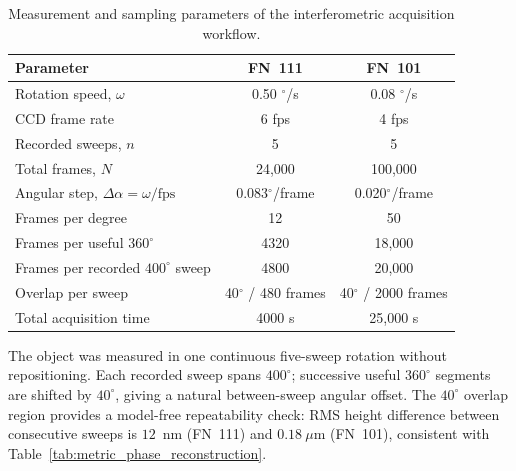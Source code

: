\documentclass[review]{elsarticle}
\begin{document}
\begin{table}[ht]
\centering
\caption{Measurement and sampling parameters of the interferometric acquisition workflow.}
\label{tab:meas_param}
\begin{tabular}{lcc}
\toprule
Parameter & FN~111 & FN~101 \\
\midrule
Rotation speed, $\omega$ & 0.50 $^\circ$/s & 0.08 $^\circ$/s \\
CCD frame rate & 6 fps & 4 fps \\
Recorded sweeps, $n$ & 5 & 5 \\
Total frames, $N$ & 24,000 & 100,000 \\
Angular step, $\Delta\alpha=\omega/\mathrm{fps}$ & 0.083$^\circ$/frame & 0.020$^\circ$/frame \\
Frames per degree & 12 & 50 \\
Frames per useful $360^\circ$ & 4320 & 18,000 \\
Frames per recorded $400^\circ$ sweep & 4800 & 20,000 \\
Overlap per sweep & 40$^\circ$ / 480 frames & 40$^\circ$ / 2000 frames \\
Total acquisition time & 4000 s & 25,000 s \\
\bottomrule
\end{tabular}
\end{table}

The object was measured in one continuous five-sweep rotation without repositioning. Each recorded sweep spans $400^\circ$; successive useful $360^\circ$ segments are shifted by $40^\circ$, giving a natural between-sweep angular offset. The $40^\circ$ overlap region provides a model-free repeatability check: RMS height difference between consecutive sweeps is $12$~nm (FN~111) and $0.18~\mu$m (FN~101), consistent with Table~\ref{tab:metric_phase_reconstruction}.
\end{document}
